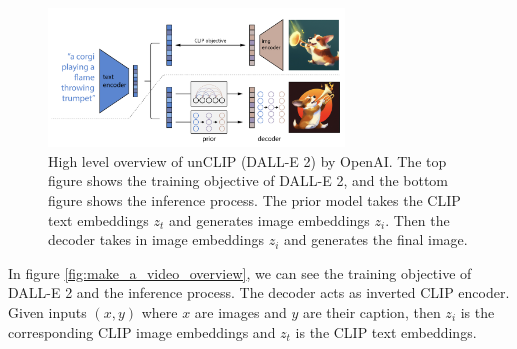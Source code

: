 \begin{figure}
    \centering
    \includegraphics[width=0.7\textwidth]{images/make_a_video/dalle_2.png}
    \caption{High level overview of unCLIP (DALL-E 2) \cite{dalle_2} by OpenAI. The top figure shows the training objective of DALL-E 2, and the bottom figure shows the inference process. The prior model takes the CLIP text embeddings $z_t$ and generates image embeddings $z_i$. Then the decoder takes in image embeddings $z_i$ and generates the final image.}
    \label{fig:make_a_video_dalle2_overview}
\end{figure}

In figure \ref{fig:make_a_video_overview}, we can see the training objective of DALL-E 2 and the inference process. The decoder acts as inverted CLIP encoder. Given inputs $(x, y)$ where $x$ are images and $y$ are their caption, then $z_i$ is the corresponding CLIP image embeddings and $z_t$ is the CLIP text embeddings.

